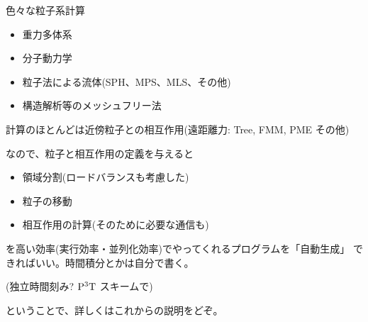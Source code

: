 \documentclass[12pt,dvipdfmx]{article}
\begin{document}






色々な粒子系計算

\begin{itemize}

\item 重力多体系

\item 分子動力学

\item 粒子法による流体(SPH、MPS、MLS、その他)
\item 構造解析等のメッシュフリー法

\end{itemize}

計算のほとんどは近傍粒子との相互作用(遠距離力: Tree, FMM, PME その他)



なので、粒子と相互作用の定義を与えると

\begin{itemize}

\item 領域分割(ロードバランスも考慮した)

\item 粒子の移動

\item 相互作用の計算(そのために必要な通信も)

\end{itemize}

を高い効率(実行効率・並列化効率)でやってくれるプログラムを「自動生成」
できればいい。時間積分とかは自分で書く。

(独立時間刻み? $\rm P^3T$ スキームで)

ということで、詳しくはこれからの説明をどぞ。
\end{document}
